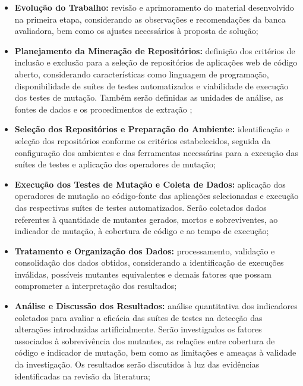 \begin{itemize}[noitemsep, topsep=0pt]

    \item \textbf{Evolução do Trabalho:} revisão e aprimoramento do material desenvolvido na primeira etapa, considerando as observações e recomendações da banca avaliadora, bem como os ajustes necessários à proposta de solução;

    \item \textbf{Planejamento da Mineração de Repositórios:} definição dos critérios de inclusão e exclusão para a seleção de repositórios de aplicações web de código aberto, considerando características como linguagem de programação, disponibilidade de suítes de testes automatizados e viabilidade de execução dos testes de mutação. Também serão definidas as unidades de análise, as fontes de dados e os procedimentos de extração \cite{acmsigsoft};

    \item \textbf{Seleção dos Repositórios e Preparação do Ambiente:} identificação e seleção dos repositórios conforme os critérios estabelecidos, seguida da configuração dos ambientes e das ferramentas necessárias para a execução das suítes de testes e aplicação dos operadores de mutação;

    \item \textbf{Execução dos Testes de Mutação e Coleta de Dados:} aplicação dos operadores de mutação ao código-fonte das aplicações selecionadas e execução das respectivas suítes de testes automatizados. Serão coletados dados referentes à quantidade de mutantes gerados, mortos e sobreviventes, ao indicador de mutação, à cobertura de código e ao tempo de execução;

    \item \textbf{Tratamento e Organização dos Dados:} processamento, validação e consolidação dos dados obtidos, considerando a identificação de execuções inválidas, possíveis mutantes equivalentes e demais fatores que possam comprometer a interpretação dos resultados;

    \item \textbf{Análise e Discussão dos Resultados:} análise quantitativa dos indicadores coletados para avaliar a eficácia das suítes de testes na detecção das alterações introduzidas artificialmente. Serão investigados os fatores associados à sobrevivência dos mutantes, as relações entre cobertura de código e indicador de mutação, bem como as limitações e ameaças à validade da investigação. Os resultados serão discutidos à luz das evidências identificadas na revisão da literatura;


\end{itemize}
